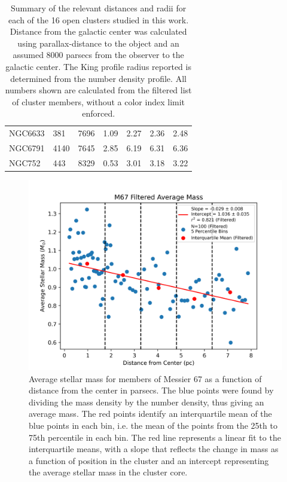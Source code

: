 \documentclass[onecolumn,table,xcdraw,super]{aastex631}
\begin{document}
\begin{table}[!h]
\begin{tabular}{lllllll}
NGC6633 & 381  & 7696  & 1.09 & 2.27 & 2.36  & 2.48 \\
NGC6791 & 4140 & 7645  & 2.85 & 6.19 & 6.31  & 6.36 \\
NGC752  & 443  & 8329  & 0.53 & 3.01 & 3.18  & 3.22 \\ \bottomrule
\end{tabular}
\caption{Summary of the relevant distances and radii for each of the 16 open clusters studied in this work. Distance from the galactic center was calculated using parallax-distance to the object and an assumed 8000 parsecs from the observer to the galactic center. The King profile radius reported is determined from the number density profile. All numbers shown are calculated from the filtered list of cluster members, without a color index limit enforced.}
\label{tab:radii}
\end{table}

\begin{figure}[]
    \centering
      \includegraphics[width=4.75in]{figures/M67_averageMass_filtered.png}
    \caption{Average stellar mass for members of Messier 67 as a function of distance from the center in parsecs. The blue points were found by dividing the mass density by the number density, thus giving an average mass. The red points identify an interquartile mean of the blue points in each bin, i.e. the mean of the points from the 25th to 75th percentile in each bin. The red line represents a linear fit to the interquartile means, with a slope that reflects the change in mass as a function of position in the cluster and an intercept representing the average stellar mass in the cluster core.}
    \label{fig:M67_average_mass}
\end{figure}
\end{document}
